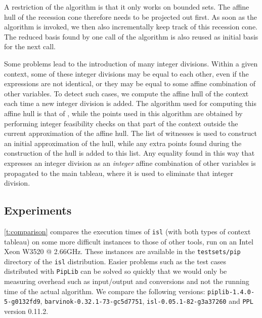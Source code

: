 A restriction of the algorithm is that it only works on bounded sets.
The affine hull of the recession cone therefore needs to be projected
out first.  As soon as the algorithm is invoked, we then also
incrementally keep track of this recession cone.  The reduced basis
found by one call of the algorithm is also reused as initial basis
for the next call.

Some problems lead to the
introduction of many integer divisions.  Within a given context,
some of these integer divisions may be equal to each other, even
if the expressions are not identical, or they may be equal to some
affine combination of other variables.
To detect such cases, we compute the affine hull of the context
each time a new integer division is added.  The algorithm used
for computing this affine hull is that of \textcite{Karr1976affine},
while the points used in this algorithm are obtained by performing
integer feasibility checks on that part of the context outside
the current approximation of the affine hull.
The list of witnesses is used to construct an initial approximation
of the hull, while any extra points found during the construction
of the hull is added to this list.
Any equality found in this way that expresses an integer division
as an \emph{integer} affine combination of other variables is
propagated to the main tableau, where it is used to eliminate that
integer division.

\subsection{Experiments}\label{s:pip:experiments}

\autoref{t:comparison} compares the execution times of {\tt isl}
(with both types of context tableau)
on some more difficult instances to those of other tools,
run on an Intel Xeon W3520 @ 2.66GHz.
These instances are available in the \lstinline{testsets/pip} directory
of the {\tt isl} distribution.
Easier problems such as the
test cases distributed with {\tt Pip\-Lib} can be solved so quickly
that we would only be measuring overhead such as input/output and conversions
and not the running time of the actual algorithm.
We compare the following versions:
{\tt piplib-1.4.0-5-g0132fd9},
{\tt barvinok-0.32.1-73-gc5d7751},
{\tt isl-0.05.1-82-g3a37260}
and {\tt PPL} version 0.11.2.

